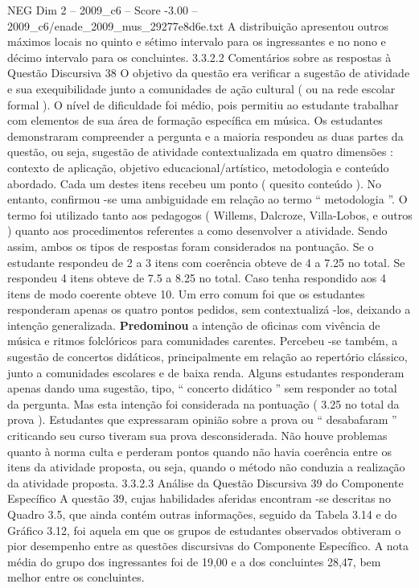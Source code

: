 \begin{textsample}{NEG Dim 2 – 2009\_c6 – Score -3.00 – 2009\_c6/enade\_2009\_mus\_29277e8d6e.txt}
A distribuição apresentou outros máximos locais no quinto e sétimo intervalo para os ingressantes e no nono e décimo intervalo para os concluintes. 3.3.2.2 Comentários sobre as respostas à Questão Discursiva 38 O objetivo da questão era verificar a sugestão de atividade e sua exequibilidade junto a comunidades de ação cultural ( ou na rede escolar formal ).
O nível de dificuldade foi médio, pois permitiu ao estudante trabalhar com elementos de sua área de formação específica em música.
Os estudantes demonstraram compreender a pergunta e a maioria respondeu as duas partes da questão, ou seja, sugestão de atividade contextualizada em quatro dimensões : contexto de aplicação, objetivo educacional/artístico, metodologia e conteúdo abordado.
Cada um destes itens recebeu um ponto ( quesito conteúdo ).
No entanto, confirmou -se uma ambiguidade em relação ao termo “ metodologia ”.
O termo foi utilizado tanto aos pedagogos ( Willems, Dalcroze, Villa-Lobos, e outros ) quanto aos procedimentos referentes a como desenvolver a atividade.
Sendo assim, ambos os tipos de respostas foram considerados na pontuação.
Se o estudante respondeu de 2 a 3 itens com coerência obteve de 4 a 7.25 no total.
Se respondeu 4 itens obteve de 7.5 a 8.25 no total.
Caso tenha respondido aos 4 itens de modo coerente obteve 10.
Um erro comum foi que os estudantes responderam apenas os quatro pontos pedidos, sem contextualizá -los, deixando a intenção generalizada. \textbf{Predominou} a intenção de oficinas com vivência de música e ritmos folclóricos para comunidades carentes.
Percebeu -se também, a sugestão de concertos didáticos, principalmente em relação ao repertório clássico, junto a comunidades escolares e de baixa renda.
Alguns estudantes responderam apenas dando uma sugestão, tipo, “ concerto didático ” sem responder ao total da pergunta.
Mas esta intenção foi considerada na pontuação ( 3.25 no total da prova ).
Estudantes que expressaram opinião sobre a prova ou “ desabafaram ” criticando seu curso tiveram sua prova desconsiderada.
Não houve problemas quanto à norma culta e perderam pontos quando não havia coerência entre os itens da atividade proposta, ou seja, quando o método não conduzia a realização da atividade proposta. 3.3.2.3 Análise da Questão Discursiva 39 do Componente Específico A questão 39, cujas habilidades aferidas encontram -se descritas no Quadro 3.5, que ainda contém outras informações, seguido da Tabela 3.14 e do Gráfico 3.12, foi aquela em que os grupos de estudantes observados obtiveram o pior desempenho entre as questões discursivas do Componente Específico.
A nota média do grupo dos ingressantes foi de 19,00 e a dos concluintes 28,47, bem melhor entre os concluintes.

\end{textsample}
